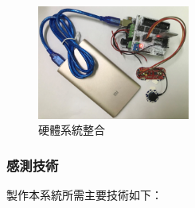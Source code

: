 \documentclass[12pt]{article}  %
\theoremstyle{plain}
\begin{document}
\begin{figure}[h]  %
\centering
\includegraphics[width=5cm]{pic/ch2/HardwareSystem.jpg}
\caption{硬體系統整合}
\end{figure}
\newpage

\subsubsection{感測技術}
製作本系統所需主要技術如下：
\end{document}
